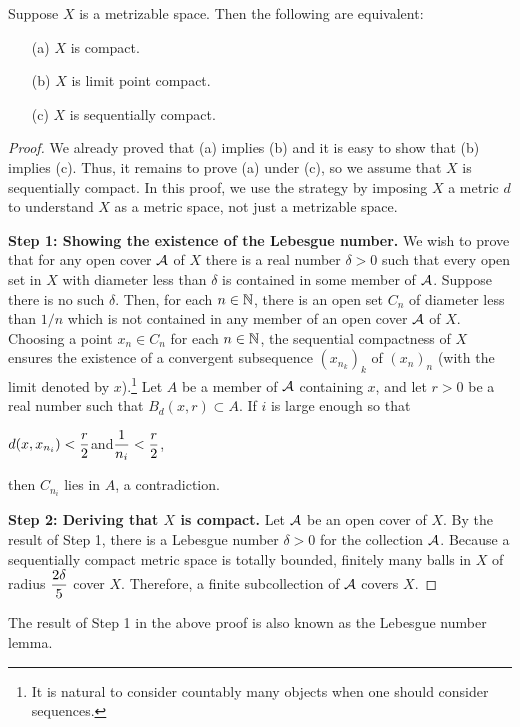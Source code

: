 \begin{thm}
    Suppose $X$ is a metrizable space.
    Then the following are equivalent:
    \begin{enumerate}
        \item[(a)]
        {
            $X$ is compact.
        }
        \item[(b)]
        {
            $X$ is limit point compact.
        }
        \item[(c)]
        {
            $X$ is sequentially compact.
        }
    \end{enumerate}
\end{thm}
\begin{proof}
    We already proved that (a) implies (b) and it is easy to show that (b) implies (c).
    Thus, it remains to prove (a) under (c), so we assume that $X$ is sequentially compact.
    In this proof, we use the strategy by imposing $X$ a metric $d$ to understand $X$ as a metric space, not just a metrizable space.
    
    \textbf{Step 1: Showing the existence of the Lebesgue number.}\newline\noindent
    We wish to prove that for any open cover ${\mathcal{A}}$ of $X$ there is a real number $\delta>0$ such that every open set in $X$ with diameter less than $\delta$ is contained in some member of ${\mathcal{A}}$.
    Suppose there is no such $\delta$.
    Then, for each $n\in{\mathbb{N}}$, there is an open set $C_n$ of diameter less than $1/n$ which is not contained in any member of an open cover ${\mathcal{A}}$ of $X$.
    Choosing a point $x_n\in C_n$ for each $n\in{\mathbb{N}}$, the sequential compactness of $X$ ensures the existence of a convergent subsequence $(x_{n_k})_k$ of $(x_n)_n$ (with the limit denoted by $x$).\footnote{It is natural to consider countably many objects when one should consider sequences.}
    Let $A$ be a member of ${\mathcal{A}}$ containing $x$, and let $r>0$ be a real number such that $B_d(x, r)\subset A$.
    If $i$ is large enough so that
    \begin{center}
        $\displaystyle{d(x, x_{n_i})<\frac{r}{2}}$\quad and\quad$\displaystyle{\frac{1}{n_i}<\frac{r}{2}}$,
    \end{center}
    then $C_{n_i}$ lies in $A$, a contradiction.
    
    \textbf{Step 2: Deriving that $X$ is compact.}\newline\noindent
    Let ${\mathcal{A}}$ be an open cover of $X$.
    By the result of Step 1, there is a Lebesgue number $\delta>0$ for the collection ${\mathcal{A}}$.
    Because a sequentially compact metric space is totally bounded, finitely many balls in $X$ of radius $\displaystyle{\frac{2\delta}{5}}$ cover $X$.
    Therefore, a finite subcollection of ${\mathcal{A}}$ covers $X$. 
\end{proof}
\begin{rmk}
    The result of Step 1 in the above proof is also known as the Lebesgue number lemma.
\end{rmk}

